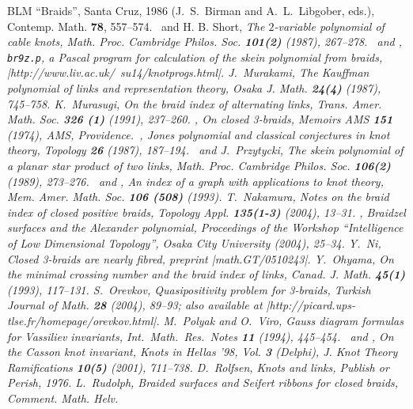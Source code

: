 {\begin{thebibliography}{BLM}
	``Braids'', Santa Cruz, 1986 (J.~S.~Birman and A.~L.~Libgober,
	eds.), Contemp. Math. {\bf 78}, 557--574.
  \bysame\ and H. B. Short, \em{The
	$2$-variable polynomial of cable knots}, Math. Proc.
	Cambridge Philos. Soc. {\bf 101(2)} (1987), 267--278.
 \bysame\ and \bysame, {\tt br9z.p}, a Pascal
	program for calculation of the skein polynomial from braids,
	\web|http://www.liv.ac.uk/~su14/knotprogs.html|.
 J.\ Murakami, \em{The Kauffman polynomial of
	links and representation theory},
	Osaka J. Math. {\bf 24(4)} (1987), 745--758.
 K.~Murasugi, \em{On the braid index of
	alternating links}, Trans. Amer. Math. Soc. {\bf 326 (1)}
	(1991), 237--260.
 \bysame, \em{On closed 3-braids},
  	Memoirs AMS {\bf 151} (1974), AMS, Providence.
 \bysame\,, \em{Jones polynomial and classical
	conjectures in knot theory}, Topology {\bf 26} (1987), 187--194.
 \bysame\ and J.~Przytycki, \em{The skein
	polynomial of a planar star product of two
	links}, Math. Proc. Cambridge Philos. Soc. {\bf 106(2)}
	(1989), 273--276.
 \bysame\ and \bysame, \em{An index of a graph
	with applications to knot theory}, Mem. Amer. Math. Soc.
	{\bf 106 (508)} (1993).
 T.~Nakamura, \em{Notes on the braid index of
	closed positive braids}, Topology Appl. {\bf 135(1-3)}
	(2004), 13--31.
 \bysame, \em{Braidzel surfaces and the
	Alexander polynomial}, Proceedings of the Workshop
	``Intelligence of Low Dimensional Topology'', Osaka
	City University (2004), 25--34.
 Y.~Ni, \em{Closed 3-braids are nearly fibred},
	preprint \web|math.GT/0510243|.
 Y.~Ohyama, \em{On the minimal crossing number
	and the braid index of links}, Canad. J. Math. {\bf 45(1)}
	(1993), 117--131.
 S.~Orevkov, \em{Quasipositivity problem for
	3-braids}, Turkish Journal of Math. {\bf 28} (2004),
	89--93; also available at
	\web|http://picard.ups-tlse.fr/homepage/orevkov.html|.
 M.~Polyak and O.~Viro,
	{\em Gauss diagram formulas for Vassiliev invariants},
	Int.\ Math.\ Res.\  Notes {\bf 11} (1994), 445--454.
 \bysame\, and \bysame, {\em On the Casson
	knot invariant}, Knots in Hellas '98, Vol. {\bf 3} (Delphi),
	J. Knot Theory Ramifications {\bf 10(5)} (2001), 711--738.
 D.~Rolfsen, {\em Knots and links}, Publish
	or Perish, 1976.
 L.\ Rudolph, \em{Braided surfaces and
	Seifert ribbons for closed braids}, Comment. Math. Helv.

\end{thebibliography}}
